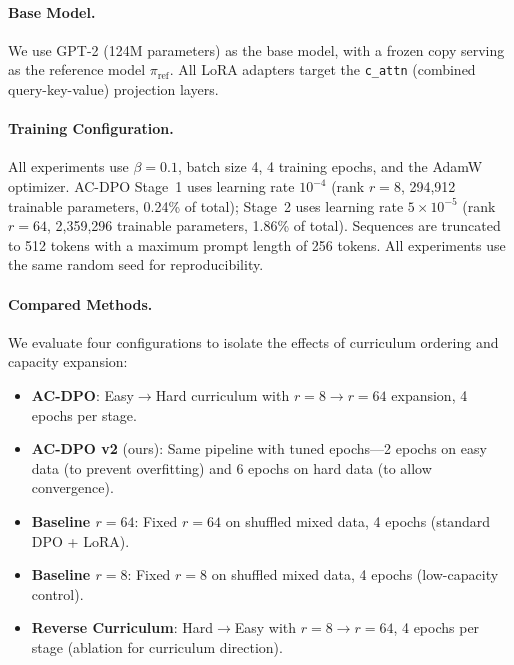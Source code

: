 \documentclass{article}
\begin{document}
\paragraph{Base Model.}
We use GPT-2 (124M parameters) \citep{radford2019gpt2} as the base model, with a frozen copy serving as the reference model $\pi_{\text{ref}}$. All LoRA adapters target the \texttt{c\_attn} (combined query-key-value) projection layers.

\paragraph{Training Configuration.}
All experiments use $\beta = 0.1$, batch size 4, 4 training epochs, and the AdamW optimizer. AC-DPO Stage~1 uses learning rate $10^{-4}$ (rank $r{=}8$, 294,912 trainable parameters, 0.24\% of total); Stage~2 uses learning rate $5 \times 10^{-5}$ (rank $r{=}64$, 2,359,296 trainable parameters, 1.86\% of total). Sequences are truncated to 512 tokens with a maximum prompt length of 256 tokens. All experiments use the same random seed for reproducibility.

\paragraph{Compared Methods.}
We evaluate four configurations to isolate the effects of curriculum ordering and capacity expansion:
\begin{itemize}
    \item \textbf{AC-DPO}: Easy$\rightarrow$Hard curriculum with $r{=}8 \rightarrow r{=}64$ expansion, 4 epochs per stage.
    \item \textbf{AC-DPO v2} (ours): Same pipeline with tuned epochs---2 epochs on easy data (to prevent overfitting) and 6 epochs on hard data (to allow convergence).
    \item \textbf{Baseline $r{=}64$}: Fixed $r{=}64$ on shuffled mixed data, 4 epochs (standard DPO + LoRA).
    \item \textbf{Baseline $r{=}8$}: Fixed $r{=}8$ on shuffled mixed data, 4 epochs (low-capacity control).
    \item \textbf{Reverse Curriculum}: Hard$\rightarrow$Easy with $r{=}8 \rightarrow r{=}64$, 4 epochs per stage (ablation for curriculum direction).
\end{itemize}
\end{document}
